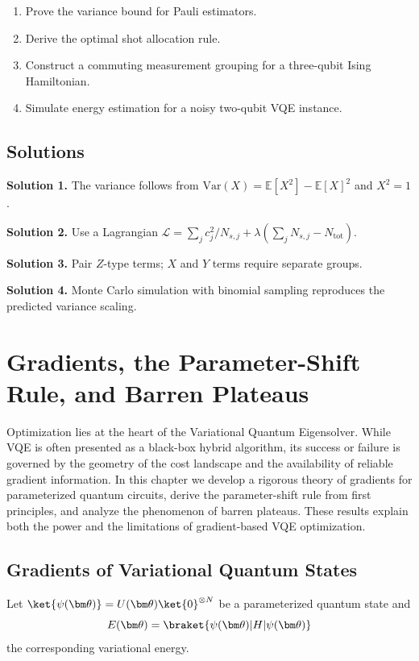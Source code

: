 \documentclass{book}
\begin{document}
\begin{enumerate}
\item Prove the variance bound for Pauli estimators.
\item Derive the optimal shot allocation rule.
\item Construct a commuting measurement grouping for a three-qubit Ising Hamiltonian.
\item Simulate energy estimation for a noisy two-qubit VQE instance.
\end{enumerate}

\section{Solutions}

\textbf{Solution 1.} The variance follows from $\mathrm{Var}(X)=\mathbb{E}[X^2]-\mathbb{E}[X]^2$ and $X^2=1$.

\textbf{Solution 2.} Use a Lagrangian $\mathcal{L}=\sum_j c_j^2/N_{s,j}+\lambda(\sum_j N_{s,j}-N_\mathrm{tot})$.

\textbf{Solution 3.} Pair $Z$-type terms; $X$ and $Y$ terms require separate groups.

\textbf{Solution 4.} Monte Carlo simulation with binomial sampling reproduces the predicted variance scaling.



\chapter{Gradients, the Parameter-Shift Rule, and Barren Plateaus}

Optimization lies at the heart of the Variational Quantum Eigensolver. While VQE is often presented as a black-box hybrid algorithm, its success or failure is governed by the geometry of the cost landscape and the availability of reliable gradient information. In this chapter we develop a rigorous theory of gradients for parameterized quantum circuits, derive the parameter-shift rule from first principles, and analyze the phenomenon of barren plateaus. These results explain both the power and the limitations of gradient-based VQE optimization.

\section{Gradients of Variational Quantum States}

Let $\ket{\psi(\bm\theta)} = U(\bm\theta)\ket{0}^{\otimes N}$ be a parameterized quantum state and
\begin{equation}
E(\bm\theta) = \braket{\psi(\bm\theta)|H|\psi(\bm\theta)}
\end{equation}
the corresponding variational energy.
\end{document}

